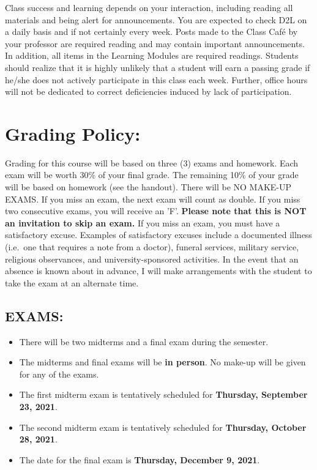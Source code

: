 \documentclass[11pt,]{article}
\providecommand{\tightlist}{%
  \setlength{\itemsep}{0pt}\setlength{\parskip}{0pt}}
\begin{document}
Class success and learning depends on your interaction,
including reading all materials and being alert for announcements. You are expected to check D2L
on a daily basis and if not certainly every week. Posts made to the Class Café by your professor are
required reading and may contain important announcements. In addition, all items in the Learning
Modules are required readings. Students should realize that it is highly unlikely that a student will
earn a passing grade if he/she does not actively participate in this class each week. Further, office
hours will not be dedicated to correct deficiencies induced by lack of participation.

\hypertarget{grading-policy}{%
\section{Grading Policy:}\label{grading-policy}}

Grading for this course will be based on three (3) exams and homework. Each exam will be worth 30\% of your final grade. The remaining 10\% of your grade will be based on homework (see the handout). There will be NO
MAKE-UP EXAMS. If you miss an exam, the next exam will count as double. If you miss two consecutive exams,
you will receive an 'F'. \textbf{Please note that this is NOT an invitation to skip an exam.} If you miss an exam,
you must have a satisfactory excuse. Examples of satisfactory excuses include a documented illness (i.e.~one that
requires a note from a doctor), funeral services, military service, religious observances, and university-sponsored
activities. In the event that an absence is known about in advance, I will make arrangements with the student to
take the exam at an alternate time.

\hypertarget{exams}{%
\subsection{EXAMS:}\label{exams}}

\begin{itemize}
\tightlist
\item
  There will be two midterms and a final exam during the semester.
\item
  The midterms and final exams will be \textbf{in person}. No make-up will be given for any of
  the exams.
\item
  The first midterm exam is tentatively scheduled for \textbf{Thursday, September 23, 2021}.
\item
  The second midterm exam is tentatively scheduled for \textbf{Thursday, October 28, 2021}.
\item
  The date for the final exam is \textbf{Thursday, December 9, 2021}.
\end{itemize}
\end{document}
